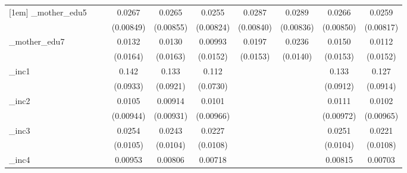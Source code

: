\begin{table}[htbp]
\begin{tabular}{l*{9}{c}}
[1em]
\_mother\_edu5&                     &                     &      0.0267\sym{***}&      0.0265\sym{***}&      0.0255\sym{***}&      0.0287\sym{***}&      0.0289\sym{***}&      0.0266\sym{***}&      0.0259\sym{***}\\
            &                     &                     &   (0.00849)         &   (0.00855)         &   (0.00824)         &   (0.00840)         &   (0.00836)         &   (0.00850)         &   (0.00817)         \\
[1em]
\_mother\_edu7&                     &                     &      0.0132         &      0.0130         &     0.00993         &      0.0197         &      0.0236\sym{*}  &      0.0150         &      0.0112         \\
            &                     &                     &    (0.0164)         &    (0.0163)         &    (0.0152)         &    (0.0153)         &    (0.0140)         &    (0.0153)         &    (0.0152)         \\
[1em]
\_inc1       &                     &                     &       0.142         &       0.133         &       0.112         &                     &                     &       0.133         &       0.127         \\
            &                     &                     &    (0.0933)         &    (0.0921)         &    (0.0730)         &                     &                     &    (0.0912)         &    (0.0914)         \\
[1em]
\_inc2       &                     &                     &      0.0105         &     0.00914         &      0.0101         &                     &                     &      0.0111         &      0.0102         \\
            &                     &                     &   (0.00944)         &   (0.00931)         &   (0.00966)         &                     &                     &   (0.00972)         &   (0.00965)         \\
[1em]
\_inc3       &                     &                     &      0.0254\sym{**} &      0.0243\sym{**} &      0.0227\sym{**} &                     &                     &      0.0251\sym{**} &      0.0221\sym{**} \\
            &                     &                     &    (0.0105)         &    (0.0104)         &    (0.0108)         &                     &                     &    (0.0104)         &    (0.0108)         \\
[1em]
\_inc4       &                     &                     &     0.00953         &     0.00806         &     0.00718         &                     &                     &     0.00815         &     0.00703         \\

\end{tabular}
\end{table}
